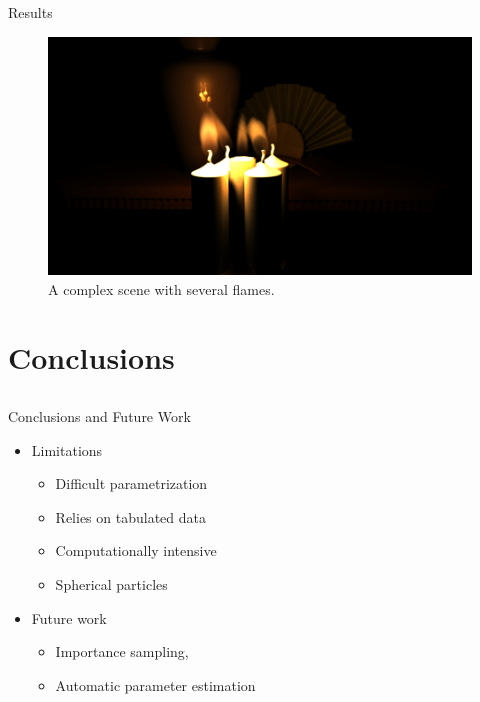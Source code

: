 \documentclass{beamer}
\begin{document}
\begin{frame}[allowframebreaks]{Results}
\begin{figure}[p]
\begin{center}
\includegraphics[width=\textwidth]{img/flames_correctly_scaled}
\caption*{\tiny{A complex scene with several flames.}}
\end{center}
\end{figure}

\end{frame}

\section{Conclusions}
\subsection{ }
\begin{frame}{Conclusions and Future Work}

\begin{itemize}
\setlength\itemsep{0.5em}
\item Limitations
	\begin{itemize}
	\setlength\itemsep{0.5em}
	\item Difficult parametrization
	\item Relies on tabulated data
	\item Computationally intensive
	\item Spherical particles
	\end{itemize}
\item Future work
	\begin{itemize}
	\setlength\itemsep{0.5em}
	\item Importance sampling,~\cite{Mizutani2014,Wang2014}
	\item Automatic parameter estimation
	\end{itemize}
\end{itemize}

\end{frame}
\end{document}
